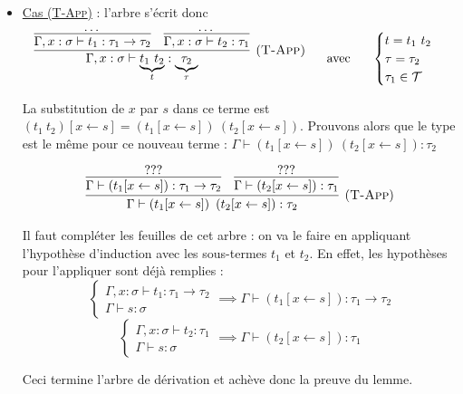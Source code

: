 \documentclass[11pt]{article}
\begin{document}
\begin{itemize}
    Ce qui complète l'arbre de preuve de $(\lambda y:\tau_1.~e\left[x\leftarrow s\right]):\tau_1\to\tau_2$.

    \item \underline{Cas ({\scshape{T-App}})} : l'arbre s'écrit donc
    $$
    \infer[\text{(\scshape{T-App})}]{
        \Gamma, x:\sigma\vdash \underbrace{t_1~t_2}_t:\underbrace{\tau_2}_\tau
    }
    {
        \infer{\Gamma, x:\sigma\vdash t_1 :\tau_1\to\tau_2}{\dots}
        &
        \infer{\Gamma, x:\sigma\vdash t_2 :\tau_1}{\dots}
    }
    ~~~~~\text{avec}~~~~~\begin{cases}
        t=t_1~t_2\\
        \tau = \tau_2\\
        \tau_1\in\mathcal{T}\\
    \end{cases}
    $$

    La substitution de $x$ par $s$ dans ce terme est $\left(t_1~t_2\right)[x\leftarrow s]=\left(t_1[x\leftarrow s]\right)~\left(t_2[x\leftarrow s]\right)$. Prouvons alors que le type est le même pour ce nouveau terme : $\Gamma\vdash \left(t_1[x\leftarrow s]\right)~\left(t_2[x\leftarrow s]\right):\tau_2$

    $$
    \infer[(\text{\scshape{T-App}})]
    {
        \Gamma\vdash \left(t_1[x\leftarrow s]\right)~\left(t_2[x\leftarrow s]\right):\tau_2
    }
    {
        \infer{\Gamma\vdash\left(t_1[x\leftarrow s]\right):\tau_1\to\tau_2}{???}
        &
        \infer{\Gamma\vdash\left(t_2[x\leftarrow s]\right):\tau_1}{???}
    }
    $$

    Il faut compléter les feuilles de cet arbre : on va le faire en appliquant l'hypothèse d'induction avec les sous-termes $t_1$ et $t_2$. En effet, les hypothèses pour l'appliquer sont déjà remplies :
    $$\begin{cases}
        \Gamma, x:\sigma\vdash t_1 :\tau_1\to\tau_2\\
        \Gamma \vdash s:\sigma 
    \end{cases}\implies \Gamma\vdash\left(t_1[x\leftarrow s]\right):\tau_1\to\tau_2$$
    $$\begin{cases}
        \Gamma, x:\sigma\vdash t_2 :\tau_1\\
        \Gamma \vdash s:\sigma 
    \end{cases}\implies \Gamma\vdash\left(t_2[x\leftarrow s]\right):\tau_1$$

    Ceci termine l'arbre de dérivation et achève donc la preuve du lemme.
\end{itemize}
\end{document}

